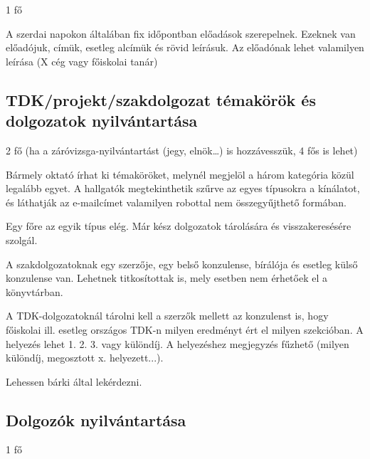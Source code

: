 \documentclass[a4paper]{article}
\begin{document}
1 fő

A szerdai napokon általában fix időpontban előadások szerepelnek.
Ezeknek van előadójuk, címük, esetleg alcímük és rövid leírásuk. Az
előadónak lehet valamilyen leírása (X cég vagy
főiskolai tanár)

\subsection{TDK/projekt/szakdolgozat témakörök és dolgozatok nyilvántartása}

2 fő (ha a záróvizsga-nyilvántartást (jegy, elnök\ldots) is hozzávesszük, 4 fős is lehet)

Bármely oktató írhat ki témaköröket, melynél megjelöl a három
kategória közül legalább egyet. A hallgatók megtekinthetik szűrve az
egyes típusokra a kínálatot, és láthatják az e-mailcímet valamilyen
robottal nem összegyűjthető formában.

Egy főre az egyik típus elég.
Már kész dolgozatok tárolására és visszakeresésére szolgál.

A szakdolgozatoknak egy szerzője, egy belső konzulense, bírálója és
esetleg külső konzulense van. Lehetnek titkosítottak is, mely esetben
nem érhetőek el a könyvtárban.

A TDK-dolgozatoknál tárolni kell a szerzők mellett az konzulenst is, hogy
főiskolai ill. esetleg országos TDK-n milyen eredményt ért el milyen
szekcióban. A helyezés lehet 1. 2. 3. vagy különdíj. A helyezéshez
megjegyzés fűzhető (milyen különdíj, megosztott x. helyezett...).

Lehessen bárki által lekérdezni.

\subsection{Dolgozók nyilvántartása}

1 fő

\end{document}
